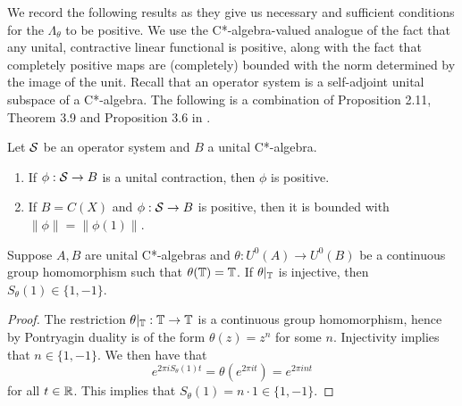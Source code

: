 \documentclass[12pt]{amsart}
\begin{document}
We record the following results as they give us necessary and sufficient conditions for the $\Lambda_\theta$ to be positive. We use the C*-algebra-valued analogue of the fact that any unital, contractive linear functional is positive, along with the fact that completely positive maps are (completely) bounded with the norm determined by the image of the unit. Recall that an operator system is a self-adjoint unital subspace of a C*-algebra. The following is a combination of Proposition 2.11, Theorem 3.9 and Proposition 3.6 in \cite{Paulsenbook}.

\begin{prop}\label{prop:abelian-operator-systems}
Let $\mathcal{S}$ be an operator system and $B$ a unital C*-algebra.
\begin{enumerate}
\item If $\phi: \mathcal{S} \to B$ is a unital contraction, then $\phi$ is positive. \label{unitalcontraction}
\item If $B = C(X)$ and $\phi: \mathcal{S} \to B$ is positive, then it is bounded with $\|\phi\| = \|\phi(1)\|$. \label{abeliantarget}
\end{enumerate}
\end{prop}



\begin{lemma}\label{lem:inj-st-pm1}
Suppose $A,B$ are unital C*-algebras and $\theta: U^0(A) \to U^0(B)$ be a continuous group homomorphism such that $\theta(\mathbb{T}) = \mathbb{T}$. If $\theta|_{\mathbb{T}}$ is injective, then $S_\theta(1) \in \{1,-1\}$. 
\begin{proof}
The restriction $\theta|_{\mathbb{T}}: \mathbb{T} \to \mathbb{T}$ is a continuous group homomorphism, hence by Pontryagin duality is of the form $\theta(z) = z^n$ for some $n$. Injectivity implies that $n \in \{1,-1\}$. We then have that
\begin{equation}
e^{2\pi i S_\theta(1)t} = \theta(e^{2\pi i t}) = e^{2\pi i nt}
\end{equation}
for all $t \in \mathbb{R}$. This implies that $S_\theta(1) = n\cdot 1 \in \{1,-1\}$. 
\end{proof}
\end{lemma}

\end{document}
